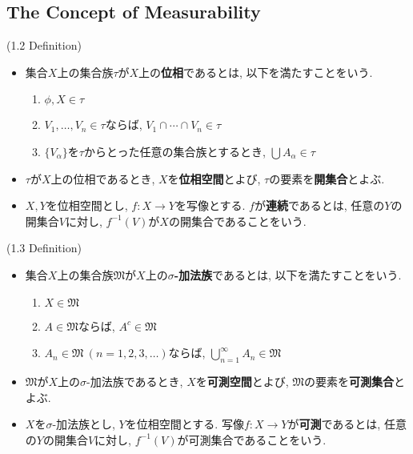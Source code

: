 \documentclass[a4paper]{jsarticle}
\begin{document}
\subsection{The Concept of Measurability}
\begin{defi}{(1.2 Definition)}{}
    \begin{itemize}
        \item 集合$X$上の集合族$\tau$が$X$上の{\bf 位相}であるとは, 以下を満たすことをいう.
        \begin{enumerate}
            \item $\phi, X\in \tau$
            \item $V_1, \dots, V_n\in \tau$ならば, $V_1\cap\cdots \cap V_n\in \tau$
            \item $\{V_\alpha\}$を$\tau$からとった任意の集合族とするとき, $\bigcup A_\alpha\in \tau$
        \end{enumerate}
        \item $\tau$が$X$上の位相であるとき, $X$を{\bf 位相空間}とよび, $\tau$の要素を{\bf 開集合}とよぶ.
        \item $X, Y$を位相空間とし, $f:X\to Y$を写像とする. $f$が{\bf 連続}であるとは, 任意の$Y$の開集合$V$に対し, $f^{-1}(V)$が$X$の開集合であることをいう.
    \end{itemize}
\end{defi}
\begin{defi}{(1.3 Definition)}{}
    \begin{itemize}
        \item 集合$X$上の集合族$\mathfrak{M}$が$X$上の{\bf $\sigma$-加法族}であるとは, 以下を満たすことをいう.
        \begin{enumerate}
            \item $X\in \mathfrak{M}$
            \item $A\in \mathfrak{M}$ならば, $A^c\in \mathfrak{M}$
            \item $A_n\in \mathfrak{M} \ (n=1, 2, 3, \dots)$ならば, $\bigcup_{n=1}^\infty A_n\in \mathfrak{M}$
        \end{enumerate}
        \item $\mathfrak{M}$が$X$上の$\sigma$-加法族であるとき, $X$を{\bf 可測空間}とよび, $\mathfrak{M}$の要素を{\bf 可測集合}とよぶ.
        \item $X$を$\sigma$-加法族とし, $Y$を位相空間とする. 写像$f:X\to Y$が{\bf 可測}であるとは, 任意の$Y$の開集合$V$に対し, $f^{-1}(V)$が可測集合であることをいう.
    \end{itemize}
\end{defi}
\end{document}

